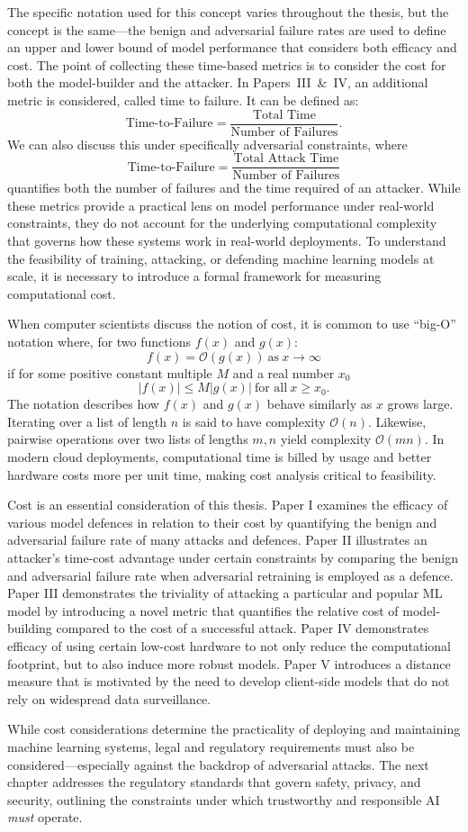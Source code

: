The specific notation used for this concept varies throughout the thesis, but the concept is the same---the benign and adversarial failure rates are used to define an upper and lower bound of model performance that considers both efficacy and cost. 
The point of collecting these time-based metrics is to consider the cost for both the model-builder and the 
attacker. 
In Papers~III~\&~IV, an additional metric is considered, called time to failure.
It can be defined as:
$$
\text{Time-to-Failure} = \frac{\text{Total~Time}}{\text{Number of Failures}}.
$$
We can also discuss this under specifically adversarial constraints, where
$$
\text{Time-to-Failure} = \frac{\text{Total~Attack~Time}}{\text{Number of Failures}}
$$
quantifies both the number of failures and the time required of an attacker.
While these metrics provide a practical lens on model performance under real-world constraints, they do not account for the underlying computational complexity that governs how these systems work in real-world deployments. 
To understand the feasibility of training, attacking, or defending machine learning models at scale, it is necessary to introduce a formal framework for measuring computational cost.

When computer scientists discuss the notion of cost, it is common to use ``big-O'' notation where, for two functions $f(x)$ and $g(x)$:
$$
f(x) = \mathcal{O}(g(x))~\text{as}~x \rightarrow \infty
$$
if for some positive constant multiple $M$ and a real number $x_0$
$$
|f(x)| \leq M |g(x)|~\text{for~all}~x\geq x_0.
$$
The notation describes how $f(x)$ and $g(x)$ behave similarly as $x$ grows large.
Iterating over a list of length $n$ is said to have complexity $\mathcal{O}(n)$. 
Likewise, pairwise operations over two lists of lengths $m,n$ yield complexity $\mathcal{O}(mn)$. 
In modern cloud deployments, computational time is billed by usage and better hardware costs more per unit time, making cost analysis critical to feasibility.

Cost is an essential consideration of this thesis.
Paper I examines the efficacy of various model defences in relation to their cost by quantifying the benign and adversarial failure rate of many attacks and defences.
Paper II illustrates an attacker's time-cost advantage under certain constraints by comparing the benign and adversarial failure rate when adversarial retraining is employed as a defence. 
Paper III demonstrates the triviality of attacking a particular and popular ML model by introducing a novel metric that quantifies the relative cost of model-building compared to the cost of a successful attack.
Paper IV demonstrates efficacy of using certain low-cost hardware to not only reduce the computational footprint, but to also induce more robust models.
Paper V introduces a distance measure that is motivated by the need to develop client-side models that do not rely on widespread data surveillance.

While cost considerations determine the practicality of deploying and maintaining machine learning systems, legal and regulatory requirements must also be considered---especially against the backdrop of adversarial attacks.
The next chapter addresses the regulatory standards that govern safety, privacy, and security, outlining the constraints under which trustworthy and responsible AI \textit{must} operate.
